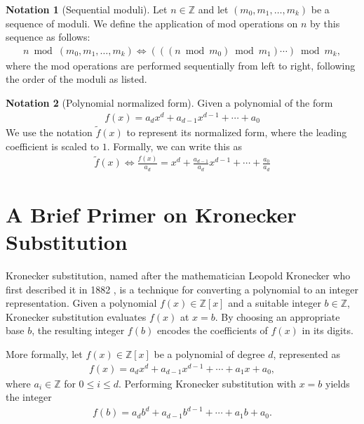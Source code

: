 \documentclass[12pt,reqno]{article}
\theoremstyle{plain}
\theoremstyle{definition}
\newtheorem{notation}{Notation}
\begin{document}
\begin{notation}[Sequential moduli]
Let $n \in \mathbb{Z}$ and let $(m_0, m_1, \ldots, m_k)$ be a sequence of moduli. We define the application of mod operations on $n$ by this sequence as follows:
\begin{align*}
    n \bmod{(m_0, m_1, \ldots, m_k)} \Longleftrightarrow  (((n \bmod{m_0}) \bmod{m_1}) \cdots ) \bmod{m_k},
\end{align*}
where the mod operations are performed sequentially from left to right, following the order of the moduli as listed.
\end{notation}

\begin{notation}[Polynomial normalized form]

Given a polynomial of the form
\begin{align*}
f(x) = a_d x^d + a_{d-1} x^{d-1} + \cdots + a_0
\end{align*}
We use the notation $\tilde{f}(x)$ to represent its normalized form, where the leading coefficient is scaled to $1$. Formally, we can write this as
\begin{align*}
    \tilde{f}(x) \Longleftrightarrow \frac{f(x)}{a_d} = x^d + \frac{a_{d-1}}{a_d} x^{d-1} + \cdots + \frac{a_0}{a_d}
\end{align*}
\end{notation}

\section{A Brief Primer on Kronecker Substitution} \label{section:kronecker}

Kronecker substitution, named after the mathematician Leopold Kronecker who first described it in 1882 \cite{kronecker1882}, is a technique for converting a polynomial to an integer representation. Given a polynomial $f(x) \in \mathbb{Z}[x]$ and a suitable integer $b \in \mathbb{Z}$, Kronecker substitution evaluates $f(x)$ at $x = b$. By choosing an appropriate base $b$, the resulting integer $f(b)$ encodes the coefficients of $f(x)$ in its digits.

More formally, let $f(x) \in \mathbb{Z}[x]$ be a polynomial of degree $d$, represented as
\begin{align*}
f(x) = a_d x^d + a_{d-1} x^{d-1} + \cdots + a_1 x + a_0,
\end{align*}
where $a_i \in \mathbb{Z}$ for $0 \leq i \leq d$. Performing Kronecker substitution with $x = b$ yields the integer
\begin{align*}
f(b) = a_d b^d + a_{d-1} b^{d-1} + \cdots + a_1 b + a_0.
\end{align*}
\end{document}
